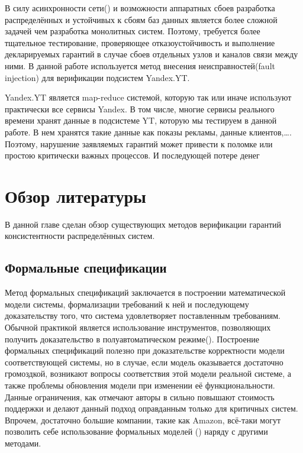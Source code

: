 \documentclass[pdftex,ptm,14pt,a4paper]{extreport}
\theoremstyle{definition}
\begin{document}
В силу асинхронности сети(\cite{network-reliable}) и возможности аппаратных сбоев разработка распределённых и устойчивых к сбоям
баз данных является более сложной задачей чем разработка монолитных систем. Поэтому, требуется более тщательное тестирование,
проверяющее отказоустойчивость и выполнение декларируемых гарантий в случае сбоев отдельных узлов и каналов связи между ними.
В данной работе используется метод внесения неисправностей(fault injection) для верификации подсистем Yandex.YT.

Yandex.YT является map-reduce системой, которую так или иначе используют практически все сервисы Yandex.
В том числе, многие сервисы реального времени хранят данные в подсистеме YT, которую мы тестируем в данной работе.
В нем хранятся такие данные как показы рекламы, данные клиентов,\dots. Поэтому, нарушение заявляемых гарантий может
привести к поломке или простою критически важных процессов. И последующей потере денег

\chapter{Обзор литературы}
В данной главе сделан обзор существующих методов
верификации гарантий консистентности распределённых систем.

\section{Формальные спецификации}
Метод формальных спецификаций заключается в построении математической модели системы, формализации требований к ней и последующему
доказательству того, что система удовлетворяет поставленным требованиям. Обычной практикой является использование инструментов, позволяющих получить доказательство в полуавтоматическом режиме(\cite{coq}).
Построение формальных спецификаций полезно при доказательстве корректности модели соответствующей
системы, но  в случае, если модель оказывается достаточно громоздкой, возникают вопросы
соответствия этой модели реальной системе, а также проблемы обновления модели при изменении её функциональности.
Данные ограничения, как отмечают авторы в \cite{models-bounds} сильно повышают стоимость поддержки
и делают данный подход оправданным только для критичных систем.
Впрочем, достаточно большие компании, такие как Amazon, всё-таки могут позволить себе использование формальных моделей
(\cite{amazon-formal-proofs}) наряду с другими методами.
\end{document}
